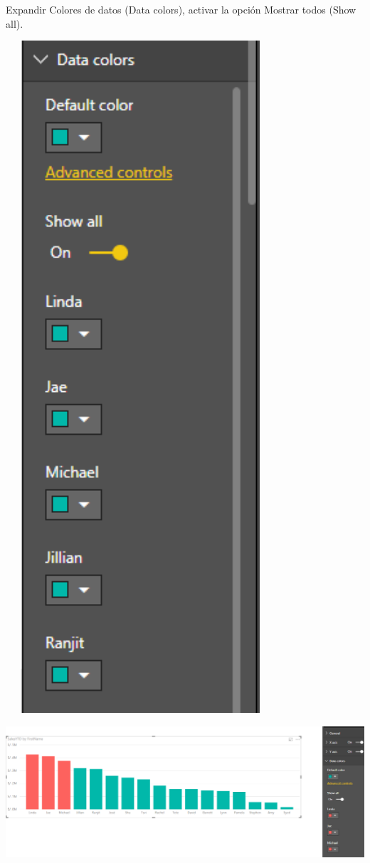 \documentclass[12pt,letterpaper]{article}
\begin{document}
Expandir Colores de datos (Data colors), activar la opción Mostrar todos (Show all).
\begin{center}
    \includegraphics[width=10cm,height=25cm]{img/23.png}  
\end{center}
\begin{center}
    \includegraphics[width=16cm]{img/24.png}  
\end{center}
\end{document}
